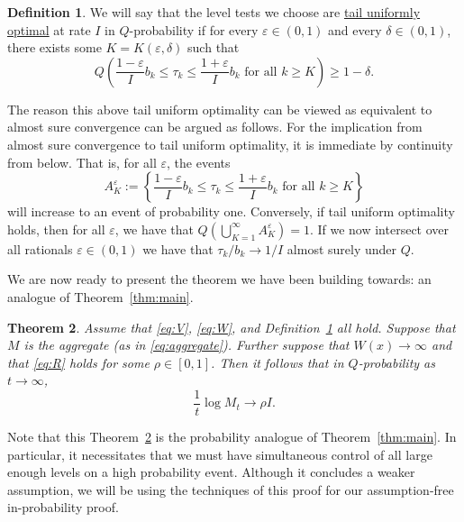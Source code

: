 \documentclass{article}
\newtheorem{theorem}{Theorem}[section]
\theoremstyle{definition}
\newtheorem{definition}[theorem]{Definition}
\begin{document}
\begin{definition}\label{def:tail-prob-opt}
We will say that the level tests we choose are \underline{tail uniformly optimal} at rate $I$ in $Q$-probability if for every $\varepsilon\in(0,1)$ and every $\delta\in(0,1)$, there exists some $K=K(\varepsilon,\delta)$ such that
\[
Q\left(\frac{1-\varepsilon}{I} b_k\le\tau_k\le\frac{1+\varepsilon}{I}b_k\text{ for all } k\ge K \right)\ge 1-\delta.
\]
\end{definition}

The reason this above tail uniform optimality can be viewed as equivalent to almost sure convergence can be argued as follows. For the implication from almost sure convergence to tail uniform optimality, it is immediate by continuity from below. That is, for all $\varepsilon$, the events
\[
A_K^\varepsilon:=\left\{\frac{1-\varepsilon}{I}b_k\le \tau_k\le\frac{1+\varepsilon}{I}b_k\text{ for all }k\ge K \right\}
\]
will increase to an event of probability one. Conversely, if tail uniform optimality holds, then for all $\varepsilon$, we have that $Q\left(\bigcup_{K=1}^{\infty} A_{K}^{\varepsilon}\right)=1$. If we now intersect over all rationals $\varepsilon\in(0,1)$ we have that $\tau_k/b_k\to 1/I$ almost surely under $Q$.

We are now ready to present the theorem we have been building towards: an analogue of Theorem~\ref{thm:main}.

\begin{theorem}\label{thm:main-prob}
Assume that \eqref{eq:V}, \eqref{eq:W}, and Definition~\ref{def:tail-prob-opt} all hold. Suppose that $M$ is the aggregate (as in \eqref{eq:aggregate}). Further suppose that $W(x)\to \infty$ and that \eqref{eq:R} holds for some $\rho\in[0,1]$. Then it follows that in $Q$-probability as $t\to\infty$,
\[
\frac{1}{t}\log M_t\longrightarrow \rho I.
\]
\end{theorem}

Note that this Theorem~\ref{thm:main-prob} is the probability analogue of Theorem~\ref{thm:main}. In particular, it necessitates that we must have simultaneous control of all large enough levels on a high probability event. Although it concludes a weaker assumption, we will be using the techniques of this proof for our assumption-free in-probability proof.
\end{document}
